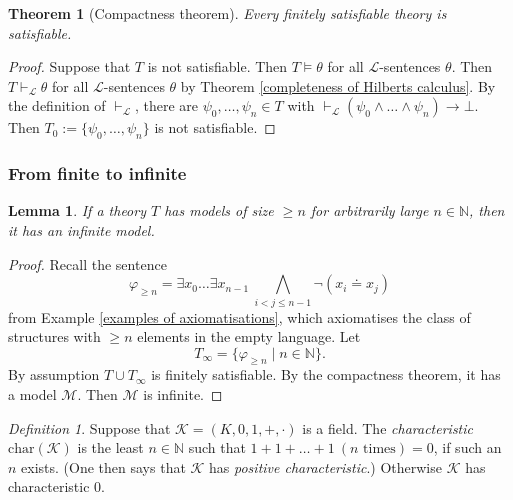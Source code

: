 \documentclass[a4paper, 11pt]{amsart}
\newtheorem{theorem}{Theorem}[subsection]
\newtheorem{lemma}[lemma]{Lemma}
\theoremstyle{remark}
\newtheorem{definition}[definition]{Definition}
\newcommand{\NN}{\mathbb{N}}
\newcommand{\cL}{\mathcal L}
\newcommand{\cM}{\mathcal M}
\newcommand{\cK}{\mathcal K}
\newenvironment{enumerate-(1)}{\begin{enumerate}[label={\upshape (\arabic*)}, leftmargin=2pc]}{\end{enumerate}}
\begin{document}
\begin{theorem}[Compactness theorem] 
\label{compactness theorem} 
Every finitely satisfiable theory is satisfiable. 
\end{theorem} 
\begin{proof} 
Suppose that $T$ is not satisfiable. 
Then $T\models \theta$ for all $\cL$-sentences $\theta$. 
Then $T\vdash_\cL \theta$ for all $\cL$-sentences $\theta$ by Theorem \ref{completeness of Hilberts calculus}. 
By the definition of $\vdash_\cL$, there are $\psi_0,\dots,\psi_n\in T$ with $\vdash_\cL (\psi_0 \wedge \dots \wedge \psi_n) \rightarrow \bot$. 
Then $T_0 := \{\psi_0,\dots, \psi_n\}$ is not satisfiable. 
\end{proof} 





\subsubsection{From finite to infinite} 


\begin{lemma} 
If a theory $T$ has models of size $\geq n$ for arbitrarily large $n\in\NN$, then it has an infinite model. 
\end{lemma} 
\begin{proof} 
Recall the sentence 
$$ \varphi_{\geq n} = \exists x_0 \dots \exists x_{n-1}\ \bigwedge_{i<j\leq n-1} \neg (x_i \doteq x_j)$$
from Example \ref{examples of axiomatisations}, which axiomatises the class of structures with ${\geq}n$ elements in the empty language. 
Let $$ T_{\infty}=\{ \varphi_{\geq n} \mid n\in \NN \}. $$ 
By assumption $T\cup T_{\infty}$ is finitely satisfiable. 
By the compactness theorem, it has a model $\cM$. 
Then $\cM$ is infinite. 
\end{proof} 

\begin{definition} 
Suppose that $\cK=(K,0,1,+,\cdot)$ is a field. 
The \emph{characteristic} $\mathrm{char}(\cK)$ is the least $n\in \NN$ such that $1+1+\dots +1\ (n\text{ times})=0$, if such an $n$ exists. 
(One then says that $\cK$ has \emph{positive characteristic}.) 
Otherwise $\cK$ has characteristic $0$. 
\end{definition} 
\end{document}
